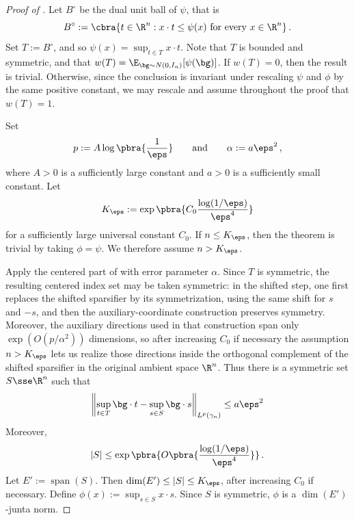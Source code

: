 \documentclass[11pt]{article}
\begin{document}
\begin{proof}[Proof of ]
	Let $B^\circ$ be the dual unit ball of $\psi$, that is 
	\[
		B^\circ
		:=
		\cbra{
			t\in\R^n:
			x\cdot t\leq \psi(x)\text{ for every }x\in\R^n
		}\,.
	\]
	Set $T:=B^\circ$, and so $\psi(x)=\sup_{t\in T} x\cdot t$. 
	Note that $T$ is bounded and symmetric, and that $w(T) = \E_{\bg\sim N(0,I_n)}[\psi(\bg)]$. 
	If $w(T)=0$, then the result is trivial.  
	Otherwise, since the conclusion is invariant under rescaling $\psi$ and $\phi$ by the same positive constant, we may rescale and assume throughout the proof that $w(T)=1$. 

	Set
	\[
		p:=A\log\pbra{\frac{1}{\eps}}
		\qquad\text{and}\qquad
		\alpha:=a\eps^2\,,
	\]
	where $A>0$ is a sufficiently large constant and $a>0$ is a
	sufficiently small constant.  
	Let
	\[
		K_\eps
		:=
		\exp\pbra{
			C_0\frac{\log(1/\eps)}{\eps^4}
		}
	\]
	for a sufficiently large universal constant $C_0$.
	If $n\leq K_\eps$, then the theorem is trivial by taking $\phi=\psi$.
	We therefore assume $n>K_\eps$.
	
	Apply the centered part of  with error parameter $\alpha$.
	Since $T$ is symmetric, the resulting centered index set may be taken symmetric: in the shifted step, one first replaces the shifted sparsifier by its symmetrization, using the same shift for $s$ and $-s$, and then the auxiliary-coordinate construction preserves symmetry.
	Moreover, the auxiliary directions used in that construction span only
	$\exp(O(p/\alpha^2))$ dimensions, so after increasing $C_0$ if necessary the assumption $n>K_\eps$ lets us realize those directions inside the orthogonal complement of the shifted sparsifier in the original ambient space $\R^n$.
	Thus there is a symmetric set $S\sse \R^n$ such that
	\begin{equation} \label{eq:nuonuo}
		\left\|
			\sup_{t\in T} \bg\cdot t
			-
			\sup_{s\in S} \bg\cdot s
		\right\|_{L^p(\gamma_n)}
		\leq
		a\eps^2
	\end{equation}
	Moreover,
	\[
		|S|
		\leq
		\exp\pbra{
			O\pbra{
				\frac{\log(1/\eps)}{\eps^4}
			}
		}\,.
	\]
	Let $E':=\operatorname{span}(S)$.
	Then $\dim(E')\leq |S|\leq K_\eps$, after increasing $C_0$ if necessary.
	Define $\phi(x):=\sup_{s\in S}x\cdot s$.
	Since $S$ is symmetric, $\phi$ is a $\dim(E')$-junta norm.


\end{proof}
\end{document}
